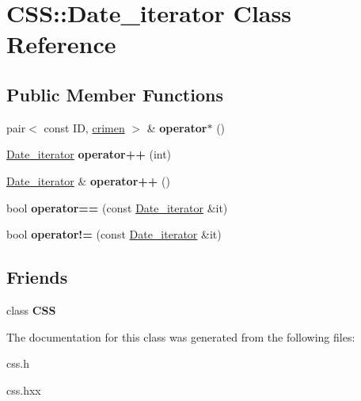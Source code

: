\hypertarget{classCSS_1_1Date__iterator}{}\section{C\+S\+S\+:\+:Date\+\_\+iterator Class Reference}
\label{classCSS_1_1Date__iterator}
\subsection*{Public Member Functions}
\begin{DoxyCompactItemize}
\item 
\hypertarget{classCSS_1_1Date__iterator_a54c3ad5151f4304757967cbf0f884020}{}pair$<$ const I\+D, \hyperlink{classcrimen}{crimen} $>$ \& {\bfseries operator$\ast$} ()\label{classCSS_1_1Date__iterator_a54c3ad5151f4304757967cbf0f884020}

\item 
\hypertarget{classCSS_1_1Date__iterator_a667b031e38220968a02077d1a32770ea}{}\hyperlink{classCSS_1_1Date__iterator}{Date\+\_\+iterator} {\bfseries operator++} (int)\label{classCSS_1_1Date__iterator_a667b031e38220968a02077d1a32770ea}

\item 
\hypertarget{classCSS_1_1Date__iterator_a2dfb8f6b2c497a06007424ec9ff7e99a}{}\hyperlink{classCSS_1_1Date__iterator}{Date\+\_\+iterator} \& {\bfseries operator++} ()\label{classCSS_1_1Date__iterator_a2dfb8f6b2c497a06007424ec9ff7e99a}

\item 
\hypertarget{classCSS_1_1Date__iterator_ada4c83534ca94ebd8667710a83bbc1a9}{}bool {\bfseries operator==} (const \hyperlink{classCSS_1_1Date__iterator}{Date\+\_\+iterator} \&it)\label{classCSS_1_1Date__iterator_ada4c83534ca94ebd8667710a83bbc1a9}

\item 
\hypertarget{classCSS_1_1Date__iterator_a59c3dcfaee3f34377d3d5a5335a4713f}{}bool {\bfseries operator!=} (const \hyperlink{classCSS_1_1Date__iterator}{Date\+\_\+iterator} \&it)\label{classCSS_1_1Date__iterator_a59c3dcfaee3f34377d3d5a5335a4713f}

\end{DoxyCompactItemize}
\subsection*{Friends}
\begin{DoxyCompactItemize}
\item 
\hypertarget{classCSS_1_1Date__iterator_a2647c6d562bc3a1ae58b7b649a0d6a02}{}class {\bfseries C\+S\+S}\label{classCSS_1_1Date__iterator_a2647c6d562bc3a1ae58b7b649a0d6a02}

\end{DoxyCompactItemize}


The documentation for this class was generated from the following files\+:\begin{DoxyCompactItemize}
\item 
css.\+h\item 
css.\+hxx\end{DoxyCompactItemize}
